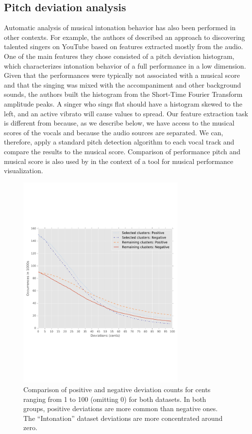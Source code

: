 \subsection{Pitch deviation analysis}
Automatic analysis of musical intonation behavior has also been performed in other contexts. For example, the authors of \cite{nichols2012automatically} described an approach to discovering talented singers on YouTube based on features extracted mostly from the audio. One of the main features they chose consisted of a pitch deviation histogram, which characterizes intonation behavior of a full performance in a low dimension. Given that the performances were typically not associated with a musical score and that the singing was mixed with the accompaniment and other background sounds, the authors built the histogram from the Short-Time Fourier Transform amplitude peaks. A singer who sings flat should have a histogram skewed to the left, and an active vibrato will cause values to spread. Our feature extraction task is different from \cite{nichols2012automatically} because, as we describe below, we have access to the musical scores of the vocals and because the audio sources are separated. We can, therefore, apply a standard pitch detection algorithm to each vocal track and compare the results to the musical score. Comparison of performance pitch and musical score is also used by \cite{lim2010intune} in the context of a tool for musical performance visualization.


\begin{figure}[h!]
    \centering
    \includegraphics[width=0.75\textwidth]{figures/full_pos_vs_neg_line.pdf}\vspace{-1in}
    \caption{Comparison of positive and negative deviation counts for cents ranging from 1 to 100 (omitting 0) for both datasets. In both groups, positive deviations are more common than negative ones. The ``Intonation'' dataset deviations are more concentrated around zero. }
    \label{fig:pos_neg}
\end{figure}

